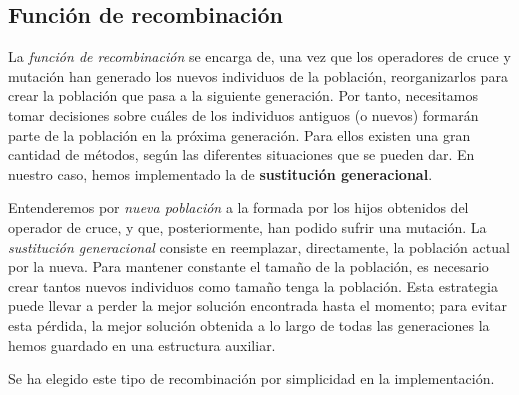 \documentclass[12pt,a4paper]{book}
\begin{document}
\subsection{Función de recombinación}
La \textsl{función de recombinación} se encarga de, una vez que los operadores de cruce y mutación han generado los nuevos individuos de la población, reorganizarlos para crear la población que pasa a la siguiente generación. Por tanto, necesitamos tomar decisiones sobre cuáles de los individuos antiguos (o nuevos) formarán parte de la población en la próxima generación. Para ellos existen una gran cantidad de métodos, según las diferentes situaciones que se pueden dar. En nuestro caso, hemos implementado la de \textbf{sustitución generacional}.

Entenderemos por \textsl{nueva población} a la formada por los hijos obtenidos del operador de cruce, y que, posteriormente, han podido sufrir una mutación. La \textsl{sustitución generacional} consiste en reemplazar, directamente, la población actual por la nueva. Para mantener constante el tamaño de la población, es necesario crear tantos nuevos individuos como tamaño tenga la población. Esta estrategia puede llevar a perder la mejor solución encontrada hasta el momento; para evitar esta pérdida, la mejor solución obtenida a lo largo de todas las generaciones la hemos guardado en una estructura auxiliar.

Se ha elegido este tipo de recombinación por simplicidad en la implementación. 
%
%	
%

\end{document}
